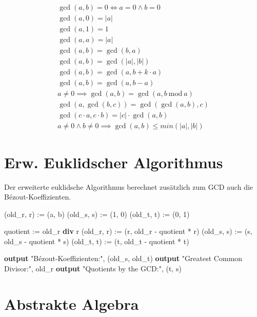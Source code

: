 \documentclass[a4paper, ngerman, landscape, fleqn]{article}
\newcommand{\Mod}{\ \mathrm{mod}\ }
\begin{document}
\begin{multicols*}{3}
\begin{align*}
    \gcd(a, b) = 0 \iff a = 0 \wedge b = 0 \\
    \gcd(a, 0) = |a| \\
    \gcd(a, 1) = 1 \\
    \gcd(a, a) = |a| \\
    \gcd(a, b) = \gcd(b, a) \\
    \gcd(a, b) = \gcd(|a|, |b|) \\
    \gcd(a, b) = \gcd(a, b + k \cdot a) \\
    \gcd(a, b) = \gcd(a, b - a) \\
    a \neq 0 \implies \gcd(a, b) = \gcd(a, b \Mod a) \\
    \gcd(a, \gcd(b, c)) = \gcd(\gcd(a, b), c) \\
    \gcd(c \cdot a, c \cdot b) = |c| \cdot \gcd(a, b) \\
    a \neq 0 \wedge b \neq 0 \implies \gcd(a, b) \leq min(|a|, |b|)
\end{align*}

\section*{Erw. Euklidscher Algorithmus}

Der erweiterte euklidsche Algorithmus berechnet zusätzlich zum GCD auch die Bézout-Koeffizienten.

\begin{algorithmic}
        \State (old\_r, r) := (a, b)
        \State (old\_s, s) := (1, 0)
        \State (old\_t, t) := (0, 1)

            \State quotient := old\_r \textbf{div} r
            \State (old\_r, r) := (r, old\_r - quotient * r)
            \State (old\_s, s) := (s, old\_s - quotient * s)
            \State (old\_t, t) := (t, old\_t - quotient * t)
        \EndWhile

        \State \textbf{output} "Bézout-Koeffizienten:", (old\_s, old\_t)
        \State \textbf{output} "Greatest Common Divisor:", old\_r
        \State \textbf{output} "Quotients by the GCD:", (t, s)

    \EndFunction
\end{algorithmic}

\section*{Abstrakte Algebra}


\end{multicols*}
\end{document}
